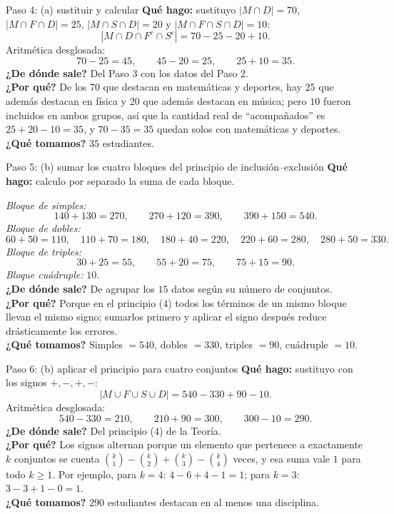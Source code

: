 \documentclass[11pt]{article}
\begin{document}
\begin{sol}
\begin{paso}{Paso 4: (a) sustituir y calcular}
\textbf{Qu\'e hago:} sustituyo $|M\cap D| = 70$, $|M\cap F\cap D| = 25$, $|M\cap S\cap D| = 20$ y $|M\cap F\cap S\cap D| = 10$:
\[
|M\cap D\cap F^{c}\cap S^{c}| = 70 - 25 - 20 + 10 .
\]
Aritm\'etica desglosada:
\[
70 - 25 = 45, \qquad 45 - 20 = 25, \qquad 25 + 10 = 35 .
\]
\textbf{¿De d\'onde sale?} Del Paso 3 con los datos del Paso 2.\\
\textbf{¿Por qu\'e?} De los $70$ que destacan en matem\'aticas y deportes, hay $25$ que adem\'as destacan en f\'isica y $20$ que adem\'as destacan en m\'usica; pero $10$ fueron incluidos en ambos grupos, as\'i que la cantidad real de ``acompa\~nados'' es $25+20-10=35$, y $70-35=35$ quedan solos con matem\'aticas y deportes.\\
\textbf{¿Qu\'e tomamos?} $35$ estudiantes.
\end{paso}

\begin{paso}{Paso 5: (b) sumar los cuatro bloques del principio de inclusi\'on--exclusi\'on}
\textbf{Qu\'e hago:} calculo por separado la suma de cada bloque.

\emph{Bloque de simples:}
\[
140+130 = 270,\qquad 270+120 = 390,\qquad 390+150 = 540 .
\]
\emph{Bloque de dobles:}
\[
60+50 = 110,\quad 110+70 = 180,\quad 180+40 = 220,\quad 220+60 = 280,\quad 280+50 = 330 .
\]
\emph{Bloque de triples:}
\[
30+25 = 55,\qquad 55+20 = 75,\qquad 75+15 = 90 .
\]
\emph{Bloque cu\'adruple:} $10$.\\
\textbf{¿De d\'onde sale?} De agrupar los $15$ datos seg\'un su n\'umero de conjuntos.\\
\textbf{¿Por qu\'e?} Porque en el principio (4) todos los t\'erminos de un mismo bloque llevan el mismo signo; sumarlos primero y aplicar el signo despu\'es reduce dr\'asticamente los errores.\\
\textbf{¿Qu\'e tomamos?} Simples $=540$, dobles $=330$, triples $=90$, cu\'adruple $=10$.
\end{paso}

\begin{paso}{Paso 6: (b) aplicar el principio para cuatro conjuntos}
\textbf{Qu\'e hago:} sustituyo con los signos $+,-,+,-$:
\[
|M\cup F\cup S\cup D| = 540 - 330 + 90 - 10 .
\]
Aritm\'etica desglosada:
\[
540 - 330 = 210,\qquad 210 + 90 = 300,\qquad 300 - 10 = 290 .
\]
\textbf{¿De d\'onde sale?} Del principio (4) de la Teor\'ia.\\
\textbf{¿Por qu\'e?} Los signos alternan porque un elemento que pertenece a exactamente $k$ conjuntos se cuenta $\binom{k}{1}-\binom{k}{2}+\binom{k}{3}-\binom{k}{4}$ veces, y esa suma vale $1$ para todo $k\ge 1$. Por ejemplo, para $k=4$: $4-6+4-1=1$; para $k=3$: $3-3+1-0=1$.\\
\textbf{¿Qu\'e tomamos?} $290$ estudiantes destacan en al menos una disciplina.
\end{paso}


\end{sol}
\end{document}
